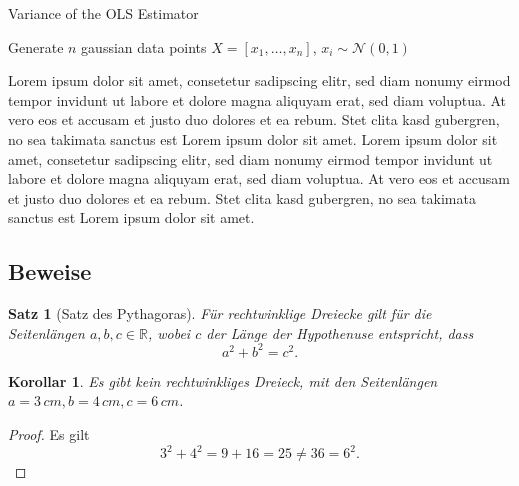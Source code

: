 \documentclass[a4paper,onecolumn]{scrartcl}
\newif\ifdraft\draftfalse
\newcommand{\missing}[1]{\todo[inline]{#1}}
\newcommand{\rtodo}[1]{\todo[backgroundcolor=red]{#1}}
\newcommand{\ytodo}[1]{\todo[backgroundcolor=yellow]{#1}}
\newcommand{\gtodo}[1]{\todo[backgroundcolor=green]{#1}}
\numberwithin{equation}{section}
\newcommand{\RR}{\mathbb{R}}
\DeclareMathOperator{\var}{var}
\theoremstyle{plain} %
\newtheorem{theorem}{Satz}[section]
\newtheorem{corollary}{Korollar}[theorem]
\theoremstyle{remark}
\newcommand{\emptyline}{\vspace{\baselineskip}}
\begin{document}
\begin{algorithm}
    \caption{Variance of the OLS Estimator}
    \emptyline

    Generate $n$ gaussian data points $X = [x_1, \ldots , x_n]$, $x_i \sim \mathcal{N}(0, 1)$ \\
    \Return{$\var(\hat{w})$}
\end{algorithm}

\missing{Test}
\gtodo{Test}
\ytodo{Test}
\rtodo{Test}

Lorem ipsum dolor sit amet, consetetur sadipscing elitr, sed diam nonumy eirmod tempor invidunt ut labore et dolore magna aliquyam erat, sed diam voluptua. At vero eos et accusam et justo duo dolores et ea rebum. Stet clita kasd gubergren, no sea takimata sanctus est Lorem ipsum dolor sit amet. Lorem ipsum dolor sit amet, consetetur sadipscing elitr, sed diam nonumy eirmod tempor invidunt ut labore et dolore magna aliquyam erat, sed diam voluptua. At vero eos et accusam et justo duo dolores et ea rebum. Stet clita kasd gubergren, no sea takimata sanctus est Lorem ipsum dolor sit amet.

\subsection{Beweise}

\begin{theorem}[Satz des Pythagoras]
  Für rechtwinklige Dreiecke gilt für die Seitenlängen $a, b, c\in\RR$, wobei $c$ der Länge der
  Hypothenuse entspricht, dass
  \begin{equation*}
    a^{2} + b^{2} = c^{2}.
  \end{equation*}
\end{theorem}
\begin{corollary}
  Es gibt kein rechtwinkliges Dreieck, mit den Seitenlängen $a=3\,cm, b=4\,cm, c=6\,cm$.
\end{corollary}
\begin{proof}
  Es gilt
  \begin{equation*}
    3^{2} + 4^{2} = 9 + 16 = 25 \neq 36 = 6^{2}.
  \end{equation*}
\end{proof}




\ifdraft\todototoc\listoftodos\fi
\end{document}
